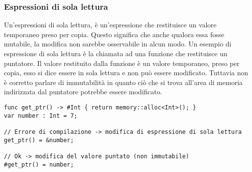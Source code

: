 \subsubsection{Espressioni di sola lettura}
Un'espressioni di sola lettura, è un'espressione che restituisce un valore temporaneo preso per copia. Questo 
significa che anche qualora essa fosse mutabile, la modifica non sarebbe osservabile in alcun modo. Un esempio di 
espressione di sola lettura è la chiamata ad una funzione che restituisce un puntatore. Il valore restituito dalla 
funzione è un valore temporaneo, preso per copia, esso si dice essere in sola lettura e non può essere modificato.
Tuttavia non è corretto parlare di immutabilità in quanto ciò che si trova all'area di memoria indirizzata dal 
puntatore potrebbe essere modificato.

\vspace{0.5cm}
\begin{lstlisting}[frame=single]
func get_ptr() -> #Int { return memory::alloc<Int>(); }
var number : Int = 7;

// Errore di compilazione -> modifica di espressione di sola lettura
get_ptr() = &number;

// Ok -> modifica del valore puntato (non immutabile)
#get_ptr() = number;

\end{lstlisting}
\vspace{0.5cm}
